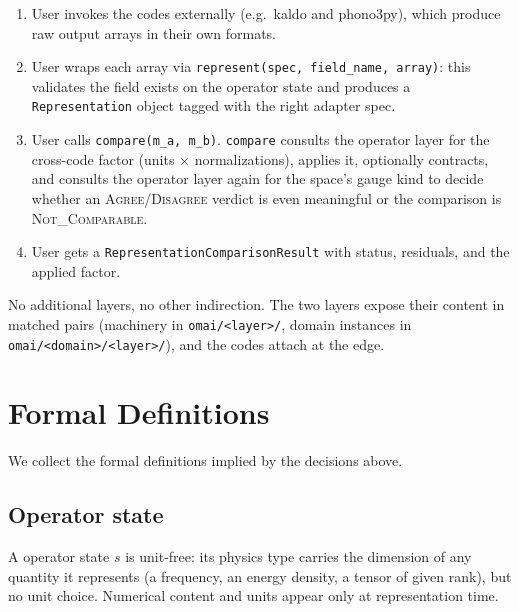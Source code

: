 \documentclass[11pt,a4paper]{article}
\begin{document}
\begin{enumerate}[leftmargin=2em, itemsep=0.2em]
  \item User invokes the codes externally (e.g.\ kaldo and phono3py),
        which produce raw output arrays in their own formats.
  \item User wraps each array via \texttt{represent(spec, field\_name,
        array)}: this validates the field exists on the operator state
        and produces a \texttt{Representation} object tagged with the
        right adapter spec.
  \item User calls \texttt{compare(m\_a, m\_b)}. \texttt{compare} consults
        the operator layer for the cross-code factor (units \(\times\)
        normalizations), applies it, optionally contracts, and consults the
        operator layer again for the space's gauge kind to decide whether
        an \textsc{Agree}/\textsc{Disagree} verdict is even meaningful or
        the comparison is \textsc{Not\_Comparable}.
  \item User gets a \texttt{RepresentationComparisonResult} with status, residuals,
        and the applied factor.
\end{enumerate}

\noindent No additional layers, no other indirection. The
two layers expose their content in matched pairs (machinery
in \texttt{omai/<layer>/}, domain instances in
\texttt{omai/<domain>/<layer>/}), and the codes attach at the edge.

\medskip

\section{Formal Definitions}
\label{sec:defs}

We collect the formal definitions implied by the decisions above.

\subsection{Operator state}

A operator state $s$ is unit-free: its physics type carries the dimension of any
quantity it represents (a frequency, an energy density, a tensor of given rank), but no
unit choice. Numerical content and units appear only at representation time.

\medskip
\end{document}
